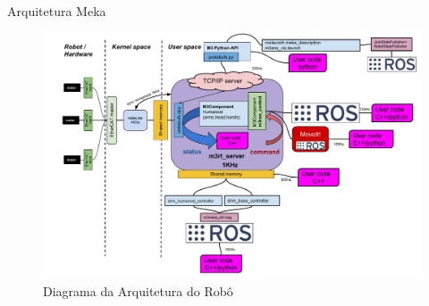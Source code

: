 \documentclass{beamer}
\begin{document}
\begin{frame}{Arquitetura Meka}
\begin{figure}
    \centering
    \includegraphics[width = \linewidth]{tex/figs/m3_arch}
    \caption{Diagrama da Arquitetura do Robô}
    \label{fig:m3_arch}
\end{figure}
\end{frame}
\end{document}
